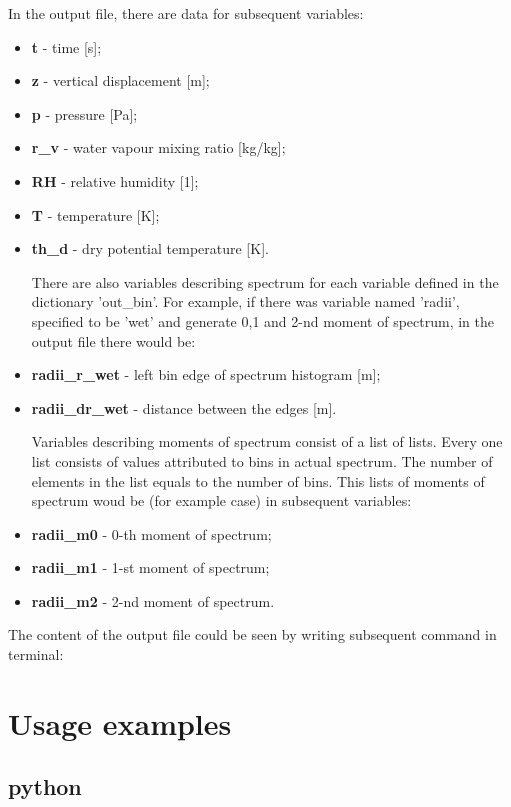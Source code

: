 \documentclass[11pt]{article}
\begin{document}
In the output file, there are data for subsequent variables:
\begin{itemize}
	\item \textbf{t} - time [s];
	\item \textbf{z} - vertical displacement [m];
	\item \textbf{p} - pressure [Pa];
	\item \textbf{r\_v} - water vapour mixing ratio [kg/kg];
	\item \textbf{RH} - relative humidity [1];
	\item \textbf{T} - temperature [K];
	\item \textbf{th\_d} - dry potential temperature [K].

There are also variables describing spectrum for each variable defined in the dictionary 'out\_bin'. For example, if there was variable named 'radii', specified to be 'wet' and generate 0,1 and 2-nd moment of spectrum, in the output file there would be:
	\item \textbf{radii\_r\_wet} - left bin edge of spectrum histogram [m];
	\item \textbf{radii\_dr\_wet} - distance between the edges [m].

Variables describing moments of spectrum consist of a list of lists. Every one list consists of values attributed to bins in actual spectrum. The number of elements in the list equals to the number of bins. This lists of moments of spectrum woud be (for example case) in subsequent variables:
	\item \textbf{radii\_m0} - 0-th moment of spectrum;
	\item \textbf{radii\_m1} - 1-st moment of spectrum;
	\item \textbf{radii\_m2} - 2-nd moment of spectrum.
\end{itemize}

The content of the output file could be seen by writing subsequent command in terminal:

\vspace{0.35cm}
\vspace{0.35cm}

\section{Usage examples}
\subsection{python}
\end{document}
